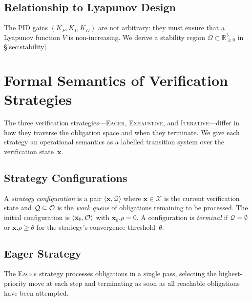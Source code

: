 \documentclass[11pt]{article}
\newcommand{\xstate}{\mathbf{x}}           %
\newcommand{\Lyap}{V}                      %
\newcommand{\vcov}{\rho}                   %
\newcommand{\Kp}{K_P}                      %
\newcommand{\Ki}{K_I}                      %
\newcommand{\Kd}{K_D}                      %
\newcommand{\Xsp}{\mathcal{X}}            %
\newcommand{\RealNum}{\mathbb{R}}
\newcommand{\GainRegion}{\Omega}           %
\begin{document}
\subsection{Relationship to Lyapunov Design}

The PID gains $(\Kp, \Ki, \Kd)$ are not arbitrary: they must ensure
that a Lyapunov function $\Lyap$ is non-increasing.  We derive a
stability region $\GainRegion \subset \RealNum_{\geq 0}^3$ in
\S\ref{sec:stability}.

\section{Formal Semantics of Verification Strategies}
\label{sec:strategies}

The three verification strategies---\textsc{Eager}, \textsc{Exhaustive},
and \textsc{Iterative}---differ in how they traverse the obligation space
and when they terminate.  We give each strategy an operational semantics
as a labelled transition system over the verification state~$\xstate$.

\subsection{Strategy Configurations}

\begin{definition}
  \label{def:stratconfig}
  A \emph{strategy configuration} is a pair
  $\langle \xstate, \mathcal{Q} \rangle$
  where $\xstate \in \Xsp$ is the current verification state and
  $\mathcal{Q} \subseteq \mathcal{O}$ is the \emph{work queue} of obligations
  remaining to be processed.  The initial configuration is
  $\langle \xstate_0, \oblig \rangle$ with $\xstate_0.\vcov = 0$.
  A configuration is \emph{terminal} if $\mathcal{Q} = \emptyset$ or
  $\xstate.\vcov \geq \theta$ for the strategy's convergence
  threshold~$\theta$.
\end{definition}

\subsection{Eager Strategy}

The \textsc{Eager} strategy processes obligations in a single pass,
selecting the highest-priority move at each step and terminating as
soon as all reachable obligations have been attempted.
\end{document}
